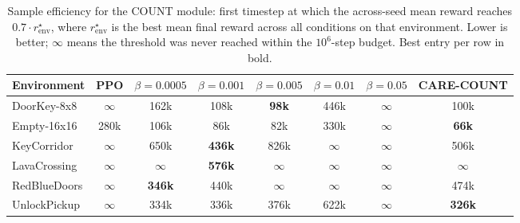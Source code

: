 \begin{table}[H]
\centering
\caption[Sample efficiency for the COUNT module.]{Sample efficiency for the COUNT module: first timestep at which the across-seed mean reward reaches $0.7 \cdot r^\star_\text{env}$, where $r^\star_\text{env}$ is the best mean final reward across all conditions on that environment. Lower is better; $\infty$ means the threshold was never reached within the $10^6$-step budget. Best entry per row in bold.}
\label{tab:sample_efficiency_count}
\small
\setlength{\tabcolsep}{4pt}
\begin{tabular}{|l|c|c|c|c|c|c|c|}
\hline
\textbf{Environment} & \textbf{PPO} & \textbf{$\beta{=}0.0005$} & \textbf{$\beta{=}0.001$} & \textbf{$\beta{=}0.005$} & \textbf{$\beta{=}0.01$} & \textbf{$\beta{=}0.05$} & \textbf{CARE-COUNT} \\
\hline
DoorKey-8x8 & $\infty$ & 162k & 108k & \textbf{98k} & 446k & $\infty$ & 100k \\
\hline
Empty-16x16 & 280k & 106k & 86k & 82k & 330k & $\infty$ & \textbf{66k} \\
\hline
KeyCorridor & $\infty$ & 650k & \textbf{436k} & 826k & $\infty$ & $\infty$ & 506k \\
\hline
LavaCrossing & $\infty$ & $\infty$ & \textbf{576k} & $\infty$ & $\infty$ & $\infty$ & $\infty$ \\
\hline
RedBlueDoors & $\infty$ & \textbf{346k} & 440k & $\infty$ & $\infty$ & $\infty$ & 474k \\
\hline
UnlockPickup & $\infty$ & 334k & 336k & 376k & 622k & $\infty$ & \textbf{326k} \\
\hline
\end{tabular}
\end{table}